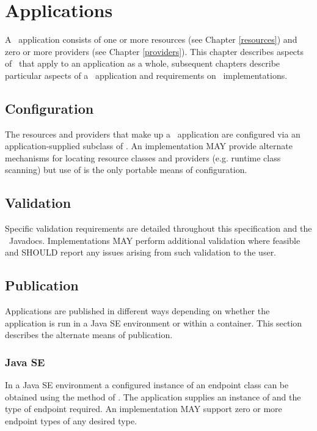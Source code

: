\chapter{Applications}
\label{applications}

A \jaxrs\ application consists of one or more resources (see Chapter \ref{resources}) and zero or more providers (see Chapter \ref{providers}). This chapter describes aspects of \jaxrs\ that apply to an application as a whole, subsequent chapters describe particular aspects of a \jaxrs\ application and requirements on \jaxrs\ implementations.

\section{Configuration}
\label{config}

The resources and providers that make up a \jaxrs\ application are configured via an application-supplied subclass of . An implementation MAY provide alternate mechanisms for locating resource classes and providers (e.g. runtime class scanning) but use of  is the only portable means of configuration.

\section{Validation}

Specific validation requirements are detailed throughout this specification and the \jaxrs\ Javadocs. Implementations MAY perform additional validation where feasible and SHOULD report any issues arising from such validation to the user.

\section{Publication}

Applications are published in different ways depending on whether the application is run in a Java SE environment or within a container. This section describes the alternate means of publication.

\subsection{Java SE}

In a Java SE environment a configured instance of an endpoint class can be obtained using the  method of \rd. The application supplies an instance of  and the type of endpoint required. An implementation MAY support zero or more endpoint types of any desired type.


